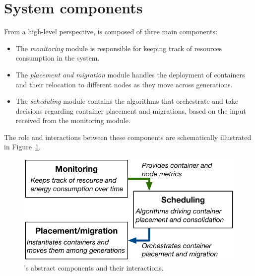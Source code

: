 
\section{System components}
\label{sec:sys_components}

From a high-level perspective, \GP is composed of three main components:
\begin{itemize}
  \item The \emph{monitoring} module is responsible for keeping track of resources consumption in the system.
  \item The \emph{placement and migration} module handles the deployment of containers and their relocation to different nodes as they move across generations.
  \item The \emph{scheduling} module contains the algorithms that orchestrate and take decisions regarding container placement and migrations, based on the input received from the monitoring module.
\end{itemize}

The role and interactions between these components are schematically illustrated in Figure~\ref{fig:components}.

\begin{figure}[H]
  \centering
  \includegraphics[]{figures/components}
  \caption{\GP's abstract components and their interactions.}
  \label{fig:components}
\end{figure}
